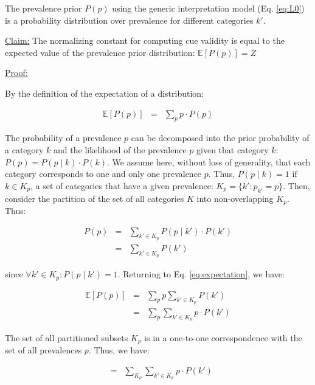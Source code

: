 \documentclass[english,,man,floatsintext]{apa6}
\theoremstyle{definition}
\theoremstyle{definition}
\theoremstyle{definition}
\theoremstyle{remark}
\begin{document}
The prevalence prior \(P(p)\) using the generic interpretation model
(Eq. \ref{eq:L0}) is a probability distribution over prevalence for
different categories \(k'\).

\underline{Claim:} The normalizing constant for computing cue validity
is equal to the expected value of the prevalence prior distribution:
\(\mathbb{E}[P(p)] = Z\)

\underline{Proof:}

By the definition of the expectation of a distribution:

\begin{eqnarray} \label{eq:expectation}
\mathbb{E}[P(p)] & = & \sum\limits_{p} p \cdot P(p) 
\end{eqnarray}

The probability of a prevalence \(p\) can be decomposed into the prior
probability of a category \(k\) and the likelihood of the prevalence
\(p\) given that category \(k\): \(P(p) = P(p \mid k) \cdot P(k)\). We
assume here, without loss of generality, that each category corresponds
to one and only one prevalence \(p\). Thus, \(P(p \mid k) = 1\) if
\(k \in K_p\), a set of categories that have a given prevalence:
\(K_p = \{k' : p_{k'} = p\}\). Then, consider the partition of the set
of all categories \(K\) into non-overlapping \(K_p\). Thus:

\begin{eqnarray} \label{eq:prevToKinds}
P(p) & = & \sum\limits_{k' \in K_p} P(p \mid k') \cdot P( k') \nonumber \\
     & = & \sum\limits_{k' \in K_p} P(k')
\end{eqnarray}

since \(\forall k' \in K_{p}: P(p \mid k') = 1\). Returning to Eq.
\ref{eq:expectation}, we have:

\begin{eqnarray} \label{eq:eq3}
\mathbb{E}[P(p)] & = & \sum\limits_{p} p \sum\limits_{k' \in K_p} P(k') \nonumber \\
                  & = & \sum\limits_{p} \sum\limits_{k' \in K_p} p \cdot P(k')
\end{eqnarray}

The set of all partitioned subsets \(K_p\) is in a one-to-one
correspondence with the set of all prevalences \(p\). Thus, we have:

\begin{eqnarray} \label{eq:bijection}
  & = & \sum\limits_{K_p} \sum\limits_{k' \in K_p} p \cdot P( k')
\end{eqnarray}
\end{document}
